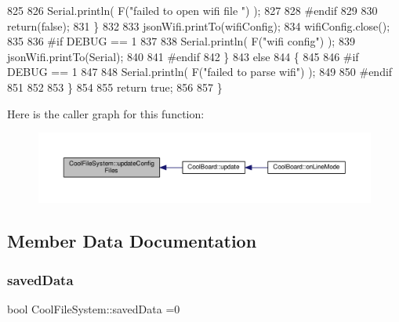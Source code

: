 \begin{DoxyCode}
825 
826             Serial.println( F(\textcolor{stringliteral}{"failed to open wifi file "}) );
827         
828 \textcolor{preprocessor}{        #endif}
829         
830             \textcolor{keywordflow}{return}(\textcolor{keyword}{false});
831         \}
832 
833         jsonWifi.printTo(wifiConfig);
834         wifiConfig.close();
835 
836 \textcolor{preprocessor}{#if DEBUG == 1 }
837 
838         Serial.println( F(\textcolor{stringliteral}{"wifi config"}) );
839         jsonWifi.printTo(Serial);
840 
841 \textcolor{preprocessor}{#endif}
842     \}
843     \textcolor{keywordflow}{else}
844     \{
845 
846 \textcolor{preprocessor}{    #if DEBUG == 1 }
847 
848         Serial.println( F(\textcolor{stringliteral}{"failed to parse wifi"}) );
849     
850 \textcolor{preprocessor}{    #endif}
851 
852     
853     \}   
854         
855     \textcolor{keywordflow}{return} \textcolor{keyword}{true};
856 
857 \}   
\end{DoxyCode}
Here is the caller graph for this function\+:
\nopagebreak
\begin{figure}[H]
\begin{center}
\leavevmode
\includegraphics[width=350pt]{classCoolFileSystem_a32dad79ae80182a83e2e8f52286b7c7b_icgraph}
\end{center}
\end{figure}


\subsection{Member Data Documentation}
\mbox{\label{classCoolFileSystem_ad398e0c5c41a0c88acdf5d672aa71351}} 
\subsubsection{\texorpdfstring{saved\+Data}{savedData}}
{\footnotesize\ttfamily bool Cool\+File\+System\+::saved\+Data =0\hspace{0.3cm}{\ttfamily [private]}}




